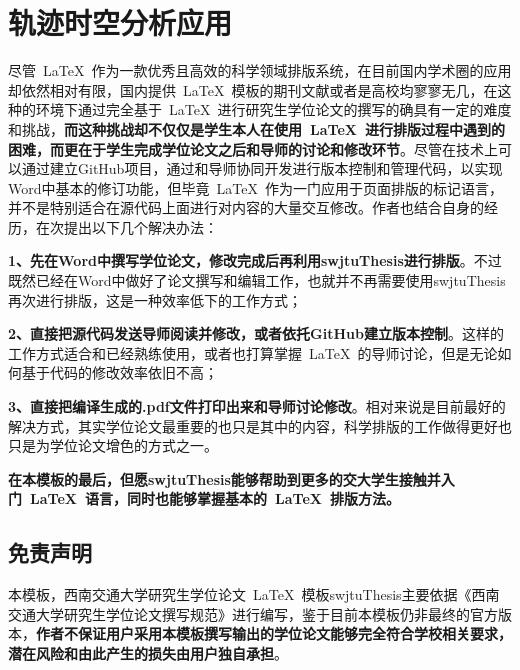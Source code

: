 \chapter{轨迹时空分析应用}

尽管~\LaTeX{}~作为一款优秀且高效的科学领域排版系统，在目前国内学术圈的应用却依然相对有限，国内提供~\LaTeX{}~模板的期刊文献或者是高校均寥寥无几，在这种的环境下通过完全基于~\LaTeX{}~进行研究生学位论文的撰写的确具有一定的难度和挑战，\textbf{而这种挑战却不仅仅是学生本人在使用~\LaTeX{}~进行排版过程中遇到的困难，而更在于学生完成学位论文之后和导师的讨论和修改环节}。尽管在技术上可以通过建立GitHub项目，通过和导师协同开发进行版本控制和管理代码，以实现Word中基本的修订功能，但毕竟~\LaTeX{}~作为一门应用于页面排版的标记语言，并不是特别适合在源代码上面进行对内容的大量交互修改。作者也结合自身的经历，在次提出以下几个解决办法：

\par
\textbf{1、先在Word中撰写学位论文，修改完成后再利用swjtuThesis进行排版}。不过既然已经在Word中做好了论文撰写和编辑工作，也就并不再需要使用swjtuThesis再次进行排版，这是一种效率低下的工作方式；

\par
\textbf{2、直接把源代码发送导师阅读并修改，或者依托GitHub建立版本控制}。这样的工作方式适合和已经熟练使用，或者也打算掌握~\LaTeX{}~的导师讨论，但是无论如何基于代码的修改效率依旧不高；

\par
\textbf{3、直接把编译生成的.pdf文件打印出来和导师讨论修改}。相对来说是目前最好的解决方式，其实学位论文最重要的也只是其中的内容，科学排版的工作做得更好也只是为学位论文增色的方式之一。

\par
\textbf{在本模板的最后，但愿swjtuThesis能够帮助到更多的交大学生接触并入门~\LaTeX{}~语言，同时也能够掌握基本的~\LaTeX{}~排版方法。}

\section{免责声明}
本模板，西南交通大学研究生学位论文~\LaTeX{}~模板swjtuThesis主要依据《西南交通大学研究生学位论文撰写规范》进行编写，鉴于目前本模板仍非最终的官方版本，\textbf{作者不保证用户采用本模板撰写输出的学位论文能够完全符合学校相关要求，潜在风险和由此产生的损失由用户独自承担}。

